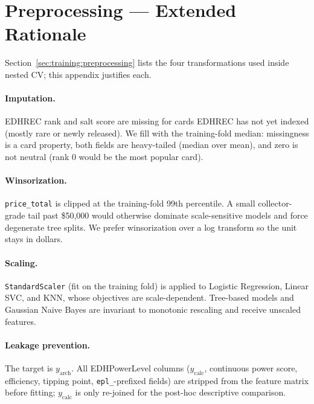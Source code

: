 \documentclass{article}
\begin{document}
\section{Preprocessing --- Extended Rationale}
\label{app:preprocessing}

Section~\ref{sec:training:preprocessing} lists the four transformations used inside nested CV; this appendix justifies each.

\paragraph{Imputation.} EDHREC rank and salt score are missing for cards EDHREC has not yet indexed (mostly rare or newly released). We fill with the training-fold median: missingness is a card property, both fields are heavy-tailed (median over mean), and zero is not neutral (rank 0 would be the most popular card).

\paragraph{Winsorization.} \texttt{price\_total} is clipped at the training-fold 99th percentile. A small collector-grade tail past \$50{,}000 would otherwise dominate scale-sensitive models and force degenerate tree splits. We prefer winsorization over a log transform so the unit stays in dollars.

\paragraph{Scaling.} \texttt{StandardScaler} (fit on the training fold) is applied to Logistic Regression, Linear SVC, and KNN, whose objectives are scale-dependent. Tree-based models and Gaussian Naive Bayes are invariant to monotonic rescaling and receive unscaled features.

\paragraph{Leakage prevention.} The target is $y_{\text{arch}}$. All EDHPowerLevel columns ($y_{\text{calc}}$, continuous power score, efficiency, tipping point, \texttt{epl\_}-prefixed fields) are stripped from the feature matrix before fitting; $y_{\text{calc}}$ is only re-joined for the post-hoc descriptive comparison.

\end{document}
